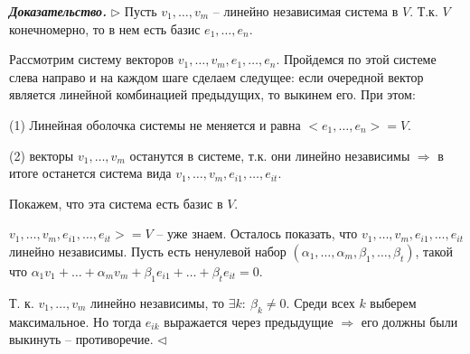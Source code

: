 \bigskip
\textbf{\textit{Доказательство.}} $\rhd$ Пусть $v_1, \dots, v_m$ -- линейно независимая система в $V$. Т.к. $V$ конечномерно, то в нем есть базис $e_1, \dots, e_n$.

Рассмотрим систему векторов $v_1, \dots, v_m, e_1, \dots, e_n$. Пройдемся по этой системе слева направо и на каждом шаге сделаем следущее: если очередной вектор является линейной комбинацией предыдущих, то выкинем его. При этом:

(1) Линейная оболочка системы не меняется и равна $<e_1, \dots, e_n> = V$.

(2) векторы $v_1, \dots, v_m$ останутся в системе, т.к. они линейно независимы $\Rightarrow$ в итоге останется система вида $v_1, \dots, v_m, e_{i1}, \dots, e_{it}$.

Покажем, что эта система есть базис в $V$.

$v_1, \dots, v_m, e_{i1}, \dots, e_{it}> = V$  -- уже знаем. Осталось показать, что $v_1, \dots, v_m, e_{i1}, \dots, e_{it}$ линейно независимы. Пусть есть ненулевой набор $(\alpha_1, \dots, \alpha_m, \beta_1, \dots, \beta_t)$, такой что $\alpha_1 v_1 + \dots + \alpha_m v_m + \beta_1 e_{i1} + \dots + \beta_t e_{it} = 0$.

Т. к. $v_1, \dots, v_m$ линейно независимы, то $\exists k: \ \beta_k \neq 0$. Среди всех $k$ выберем максимальное. Но тогда $e_{ik}$ выражается через предыдущие $\Rightarrow$ его должны были выкинуть -- противоречие. $\lhd$

